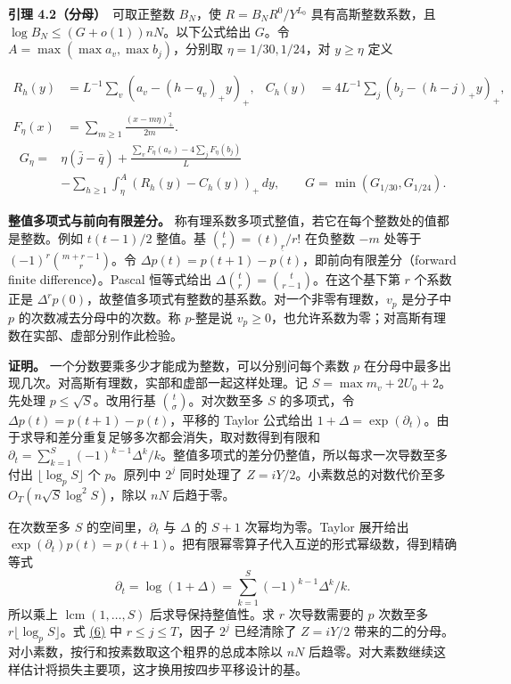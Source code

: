 \documentclass[11pt,a4paper]{article}
\begin{document}
\textbf{引理 4.2（分母）}　可取正整数 \(B_N\)，使 \(R=B_NR^0/Y^{L_0}\) 具有高斯整数系数，且 \(\log B_N\le (G+o(1))nN\)。以下公式给出 \(G\)。令 \(A=\max(\max a_v,\max b_j)\)，分别取 \(\eta=1/30,1/24\)，对 \(y\ge\eta\) 定义

\[
 \begin{aligned}
 R_h(y)&=L^{-1}\sum_v(a_v-(h-q_v)_+y)_+,&
 C_h(y)&=4L^{-1}\sum_j(b_j-(h-j)_+y)_+,\\
 F_\eta(x)&=\sum_{m\ge1}\frac{(x-m\eta)_+^2}{2m}.&&
 \end{aligned}
\] \[
 \begin{aligned}
 G_\eta={}&\eta(\bar j-\bar q)+
 \frac{\sum_v F_\eta(a_v)-4\sum_j F_\eta(b_j)}{L}\\
 &-\sum_{h\ge1}\int_\eta^{A}(R_h(y)-C_h(y))_+\,dy,\qquad
 G=\min(G_{1/30},G_{1/24}).
 \end{aligned}\tag{9}\label{eq:9}
\]

\textbf{整值多项式与前向有限差分。} 称有理系数多项式整值，若它在每个整数处的值都是整数。例如 \(t(t-1)/2\) 整值。基 \(\binom tr=(t)_{\underline r}/r!\) 在负整数 \(-m\) 处等于 \((-1)^r\binom{m+r-1}r\)。令 \(\Delta p(t)=p(t+1)-p(t)\)，即前向有限差分（forward finite difference）。Pascal 恒等式给出 \(\Delta\binom tr=\binom t{r-1}\)。在这个基下第 \(r\) 个系数正是 \(\Delta^r p(0)\)，故整值多项式有整数的基系数。对一个非零有理数，\(v_p\) 是分子中 \(p\) 的次数减去分母中的次数。称 \(p\)-整是说 \(v_p\ge0\)，也允许系数为零；对高斯有理数在实部、虚部分别作此检验。

\textbf{证明。} 一个分数要乘多少才能成为整数，可以分别问每个素数 \(p\) 在分母中最多出现几次。对高斯有理数，实部和虚部一起这样处理。记 \(S=\max m_v+2U_0+2\)。先处理 \(p\le\sqrt S\)。改用行基 \(\binom t\sigma\)。对次数至多 \(S\) 的多项式，令 \(\Delta p(t)=p(t+1)-p(t)\)，平移的 Taylor 公式给出 \(1+\Delta=\exp(\partial_t)\)。由于求导和差分重复足够多次都会消失，取对数得到有限和 \(\partial_t=\sum_{k=1}^S(-1)^{k-1}\Delta^k/k\)。整值多项式的差分仍整值，所以每求一次导数至多付出 \(\lfloor\log_p S\rfloor\) 个 \(p\)。原列中 \(2^j\) 同时处理了 \(Z=iY/2\)。小素数总的对数代价至多 \(O_T(n\sqrt S\log^2 S)\)，除以 \(nN\) 后趋于零。

在次数至多 \(S\) 的空间里，\(\partial_t\) 与 \(\Delta\) 的 \(S+1\) 次幂均为零。Taylor 展开给出 \(\exp(\partial_t)p(t)=p(t+1)\)。把有限幂零算子代入互逆的形式幂级数，得到精确等式 \[
 \partial_t=\log(1+\Delta)=\sum_{k=1}^{S}(-1)^{k-1}\Delta^k/k .
\] 所以乘上 \(\operatorname{lcm}(1,\ldots,S)\) 后求导保持整值性。求 \(r\) 次导数需要的 \(p\) 次数至多 \(r\lfloor\log_p S\rfloor\)。式 \hyperref[eq:6]{(6)} 中 \(r\le j\le T\)，因子 \(2^j\) 已经清除了 \(Z=iY/2\) 带来的二的分母。对小素数，按行和按素数取这个粗界的总成本除以 \(nN\) 后趋零。对大素数继续这样估计将损失主要项，这才换用按四步平移设计的基。
\end{document}
